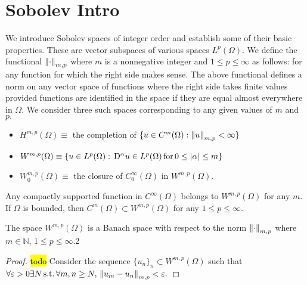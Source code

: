 \section{Sobolev Intro}
We introduce Sobolev spaces of integer order and establish some of their basic properties. These are vector subspaces of various spaces $L^p(\Omega).$ We define the functional $\norm{\cdot}_{m,p}$ where $m$ is a nonnegative integer and $1\leq p\leq \infty$ as follows:
for any function for which the right side makes sense. The above functional defines a norm on any vector space of functions where the right side takes finite values provided functions are identified in the space if they are equal almost everywhere in $\Omega.$ We consider three such spaces corresponding to any given values of $m$ and $p.$
\begin{itemize}
    \item $H^{m,p}(\Omega)\equiv$ the completion of $\{u\in C^m(\Omega):\norm{u}_{m,p}<\infty\}$
    \item $W^{m,p}(\Omega)\equiv\{u\in L^p(\Omega):\,\mathrm{D}^\alpha u\in L^p(\Omega)\,\mathrm{for}\,0\leq\abs{\alpha}\leq m\}$
    \item $W_0^{m,p}(\Omega)\equiv$ the closure of $C_0^\infty(\Omega)$ in $W^{m,p}(\Omega).$
\end{itemize}
Any compactly supported function in $C^\infty(\Omega)$ belongs to $W^{m,p}(\Omega)$ for any $m.$ If $\Omega$ is bounded, then $C^{m}(\Omega)\subset W^{m,p}(\Omega)$ for any $1\leq p\leq\infty.$
\begin{theorem}
    The space $W^{m,p}(\Omega)$ is a Banach space with respect to the norm $\norm{\cdot}_{m,p}$ where $m\in\mathbb{N},\,1\leq p\leq\infty.$2
\end{theorem}
\begin{proof}
    \hl{todo}
    Consider the sequence $\{u_n\}_n\subset W^{m,p}(\Omega)$ such that $\forall\varepsilon>0\exists N\,\mathrm{s.t.}\,\forall m,n\geq N,\,\norm{u_m-u_n}_{m,p}<\varepsilon.$
\end{proof}

